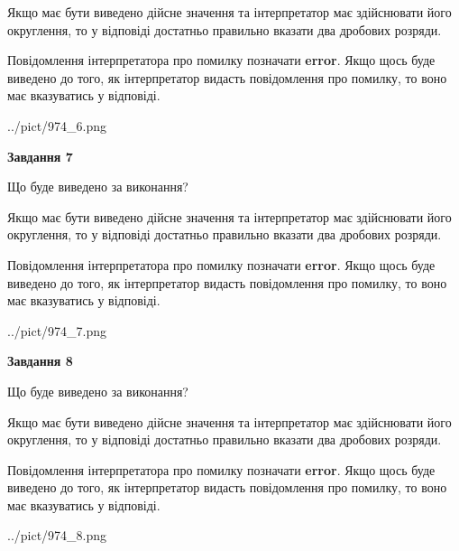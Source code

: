 \documentclass[12pt, ukrainian]{article}
\begin{document}
{\begin {Large}
Якщо має бути виведено дійсне значення та інтерпретатор має здійснювати його округлення, 
то у відповіді достатньо правильно вказати два дробових розряди.

Повідомлення інтерпретатора про помилку позначати \textbf{error}.
Якщо щось буде виведено до того, як інтерпретатор видасть повідомлення про помилку, 
то воно має вказуватись у відповіді. \par

\begin{center}
	{../pict/974_6.png}
\end{center}
\newpage

{\begin {center}\textbf{Завдання 7}\end {center}}\par
Що буде виведено за виконання? \par

Якщо має бути виведено дійсне значення та інтерпретатор має здійснювати його округлення, 
то у відповіді достатньо правильно вказати два дробових розряди.

Повідомлення інтерпретатора про помилку позначати \textbf{error}.
Якщо щось буде виведено до того, як інтерпретатор видасть повідомлення про помилку, 
то воно має вказуватись у відповіді. \par

\begin{center}
	{../pict/974_7.png}
\end{center}
\newpage

{\begin {center}\textbf{Завдання 8}\end {center}}\par
Що буде виведено за виконання? \par

Якщо має бути виведено дійсне значення та інтерпретатор має здійснювати його округлення, 
то у відповіді достатньо правильно вказати два дробових розряди.

Повідомлення інтерпретатора про помилку позначати \textbf{error}.
Якщо щось буде виведено до того, як інтерпретатор видасть повідомлення про помилку, 
то воно має вказуватись у відповіді. \par

\begin{center}
	{../pict/974_8.png}
\end{center}
\newpage


\end{Large}}
\end{document}
